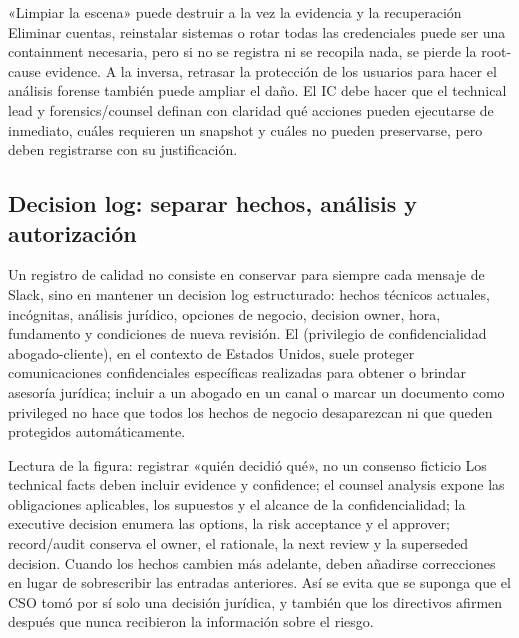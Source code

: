 \begin{warningbox}{«Limpiar la escena» puede destruir a la vez la evidencia y la recuperación}
Eliminar cuentas, reinstalar sistemas o rotar todas las credenciales puede ser una containment necesaria, pero si no se registra ni se recopila nada, se pierde la root-cause evidence. A la inversa, retrasar la protección de los usuarios para hacer el análisis forense también puede ampliar el daño. El IC debe hacer que el technical lead y forensics/counsel definan con claridad qué acciones pueden ejecutarse de inmediato, cuáles requieren un snapshot y cuáles no pueden preservarse, pero deben registrarse con su justificación.
\end{warningbox}

\subsection{Decision log: separar hechos, análisis y autorización}

Un registro de calidad no consiste en conservar para siempre cada mensaje de Slack, sino en mantener un decision log estructurado: hechos técnicos actuales, incógnitas, análisis jurídico, opciones de negocio, decision owner, hora, fundamento y condiciones de nueva revisión. El  (privilegio de confidencialidad abogado-cliente), en el contexto de Estados Unidos, suele proteger comunicaciones confidenciales específicas realizadas para obtener o brindar asesoría jurídica; incluir a un abogado en un canal o marcar un documento como privileged no hace que todos los hechos de negocio desaparezcan ni que queden protegidos automáticamente.


\begin{knowledgebox}{Lectura de la figura: registrar «quién decidió qué», no un consenso ficticio}
Los technical facts deben incluir evidence y confidence; el counsel analysis expone las obligaciones aplicables, los supuestos y el alcance de la confidencialidad; la executive decision enumera las options, la risk acceptance y el approver; record/audit conserva el owner, el rationale, la next review y la superseded decision. Cuando los hechos cambien más adelante, deben añadirse correcciones en lugar de sobrescribir las entradas anteriores. Así se evita que se suponga que el CSO tomó por sí solo una decisión jurídica, y también que los directivos afirmen después que nunca recibieron la información sobre el riesgo.
\end{knowledgebox}

